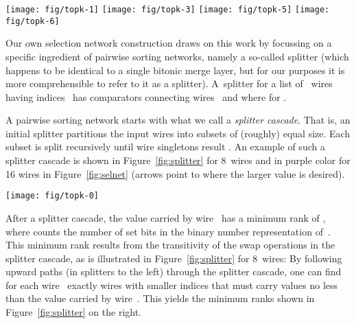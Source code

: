 \documentclass{article}
\begin{document}
\begin{table}[t]
\begin{figure*}[t]
\centering
\texttt{[image: fig/topk-1]}\hfill
\texttt{[image: fig/topk-3]}\hfill
\texttt{[image: fig/topk-5]}\hfill
\texttt{[image: fig/topk-6]}
\caption{\label{fig:splitter}Minimum ranks after a splitter cascade
  resulting from the transitive closure of the swaps.}
\end{figure*}


Our own selection network construction draws on this work by focussing
on a specific ingredient of pairwise sorting networks, namely a
so-called splitter (which happens to be identical to a single
bitonic merge layer, but for our purposes it is more comprehensible to
refer to it as a splitter). A~splitter for a list of ~wires having
indices~ has comparators connecting
wires~ and  where 
for .

A pairwise sorting network starts with what we
call a {\em splitter cascade}. That is, an initial splitter
partitions the input wires into subsets of (roughly) equal size.
Each subset is split recursively until wire singletons result
\citep{Zazon-Ivry_and_Codish_2012}. An example of such a splitter cascade is
shown in Figure~\ref{fig:splitter} for 8~wires and in purple color for
16 wires in Figure~\ref{fig:selnet}
(arrows point to where the larger value is desired).


\begin{figure*}[t]
\centering
\texttt{[image: fig/topk-0]}
\caption{\label{fig:selnet}A  selection network constructed
  with the method described in the text. The numbers on the wires are
  the minimum ranks (starting at 0) that can be occupied by the values
  on these wires. Red crosses mark where wires can be excluded, green
  check marks where a top rank is determined. Swaps in blocks of equal
  color belong to the same splitter cascade. Swaps in gray boxes would
  be needed for full splitter cascades, but are not needed to determine
  the top 5 ranks.}
\end{figure*}


After a splitter cascade, the value carried by wire~ has a
minimum rank of , where  counts the number of
set bits in the binary number representation of~. This minimum rank
results from the transitivity of the swap operations in the splitter
cascade, as is illustrated in Figure~\ref{fig:splitter} for 8~wires:
By following upward paths (in splitters to the left) through the
splitter cascade, one can find for each wire~ exactly
 wires with smaller indices that must carry values
no less than the value carried by wire~. This yields the
minimum ranks shown in Figure~\ref{fig:splitter} on the right.




\end{table}
\end{document}
